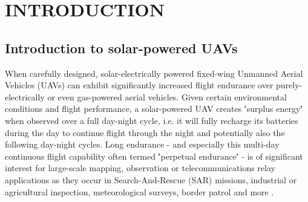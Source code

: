 \section{INTRODUCTION}

 \subsection{Introduction to solar-powered UAVs}
 When carefully designed, solar-electrically powered fixed-wing Unmanned Aerial Vehicles (UAVs) can exhibit significantly increased flight endurance over purely-electrically or even gas-powered aerial vehicles. Given certain environmental conditions and flight performance, a solar-powered UAV creates \''surplus energy\'' when observed over a full day-night cycle, i.e. it will fully recharge its batteries during the day to continue flight through the night and potentially also the following day-night cycles. Long endurance - and especially this multi-day continuous flight capability often termed \''perpetual endurance\'' - is of significant interest for large-scale mapping, observation or telecommunications relay applications as they occur in Search-And-Rescue (SAR) missions, industrial or agricultural inspection, meteorological surveys, border patrol and more \cite{NASA_Pathfinder}.
 
